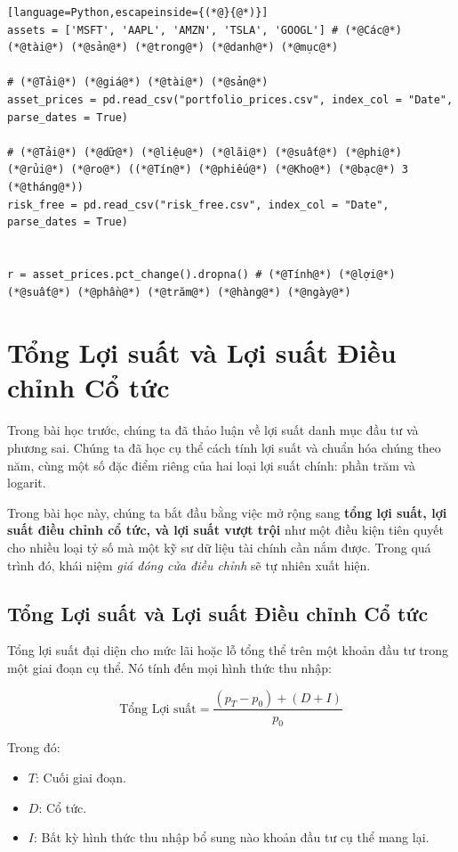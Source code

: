 \begin{lstlisting}[language=Python,escapeinside={(*@}{@*)}]
assets = ['MSFT', 'AAPL', 'AMZN', 'TSLA', 'GOOGL'] # (*@Các@*) (*@tài@*) (*@sản@*) (*@trong@*) (*@danh@*) (*@mục@*)

# (*@Tải@*) (*@giá@*) (*@tài@*) (*@sản@*)
asset_prices = pd.read_csv("portfolio_prices.csv", index_col = "Date", parse_dates = True)

# (*@Tải@*) (*@dữ@*) (*@liệu@*) (*@lãi@*) (*@suất@*) (*@phi@*) (*@rủi@*) (*@ro@*) ((*@Tín@*) (*@phiếu@*) (*@Kho@*) (*@bạc@*) 3 (*@tháng@*))
risk_free = pd.read_csv("risk_free.csv", index_col = "Date", parse_dates = True)


r = asset_prices.pct_change().dropna() # (*@Tính@*) (*@lợi@*) (*@suất@*) (*@phần@*) (*@trăm@*) (*@hàng@*) (*@ngày@*)
\end{lstlisting}

\section{Tổng Lợi suất và Lợi suất Điều chỉnh Cổ tức}

Trong bài học trước, chúng ta đã thảo luận về lợi suất danh mục đầu tư và phương sai. Chúng ta đã học cụ thể cách tính lợi suất và chuẩn hóa chúng theo năm, cùng một số đặc điểm riêng của hai loại lợi suất chính: phần trăm và logarit.

Trong bài học này, chúng ta bắt đầu bằng việc mở rộng sang \textbf{tổng lợi suất, lợi suất điều chỉnh cổ tức, và lợi suất vượt trội} như một điều kiện tiên quyết cho nhiều loại tỷ số mà một kỹ sư dữ liệu tài chính cần nắm được. Trong quá trình đó, khái niệm \emph{giá đóng cửa điều chỉnh} sẽ tự nhiên xuất hiện.

\subsection{Tổng Lợi suất và Lợi suất Điều chỉnh Cổ tức}

Tổng lợi suất đại diện cho mức lãi hoặc lỗ tổng thể trên một khoản đầu tư trong một giai đoạn cụ thể. Nó tính đến mọi hình thức thu nhập:

$$
\text{Tổng Lợi suất} = \frac{(p_{T} - p_{0}) + (D + I)}{p_{0}}
$$

Trong đó:
\begin{itemize}
  \item $T$: Cuối giai đoạn.
  \item $D$: Cổ tức.
  \item $I$: Bất kỳ hình thức thu nhập bổ sung nào khoản đầu tư cụ thể mang lại.
\end{itemize}

